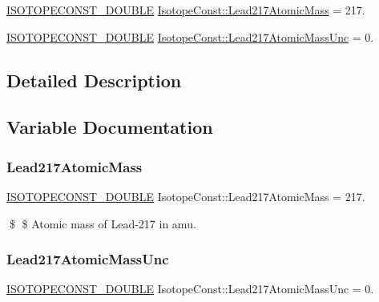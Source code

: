 \begin{DoxyCompactItemize}
\item 
\mbox{\hyperlink{group___isotope_const-_macros_ga8f45a7272ce02c0b4c65c44636ed719a}{I\+S\+O\+T\+O\+P\+E\+C\+O\+N\+S\+T\+\_\+\+D\+O\+U\+B\+LE}} \mbox{\hyperlink{group___isotope_const-_lead-_pb217_gacf2c0284870770903754b5be3a108e2a}{Isotope\+Const\+::\+Lead217\+Atomic\+Mass}} = 217.
\item 
\mbox{\hyperlink{group___isotope_const-_macros_ga8f45a7272ce02c0b4c65c44636ed719a}{I\+S\+O\+T\+O\+P\+E\+C\+O\+N\+S\+T\+\_\+\+D\+O\+U\+B\+LE}} \mbox{\hyperlink{group___isotope_const-_lead-_pb217_ga06a40ecb5d6ccb4c1ce7fa7d09f90de0}{Isotope\+Const\+::\+Lead217\+Atomic\+Mass\+Unc}} = 0.
\end{DoxyCompactItemize}


\subsection{Detailed Description}


\subsection{Variable Documentation}
\mbox{\label{group___isotope_const-_lead-_pb217_gacf2c0284870770903754b5be3a108e2a}} 
\subsubsection{\texorpdfstring{Lead217\+Atomic\+Mass}{Lead217AtomicMass}}
{\footnotesize\ttfamily \mbox{\hyperlink{group___isotope_const-_macros_ga8f45a7272ce02c0b4c65c44636ed719a}{I\+S\+O\+T\+O\+P\+E\+C\+O\+N\+S\+T\+\_\+\+D\+O\+U\+B\+LE}} Isotope\+Const\+::\+Lead217\+Atomic\+Mass = 217.}

\$ \$ Atomic mass of Lead-\/217 in amu. \mbox{\label{group___isotope_const-_lead-_pb217_ga06a40ecb5d6ccb4c1ce7fa7d09f90de0}} 
\subsubsection{\texorpdfstring{Lead217\+Atomic\+Mass\+Unc}{Lead217AtomicMassUnc}}
{\footnotesize\ttfamily \mbox{\hyperlink{group___isotope_const-_macros_ga8f45a7272ce02c0b4c65c44636ed719a}{I\+S\+O\+T\+O\+P\+E\+C\+O\+N\+S\+T\+\_\+\+D\+O\+U\+B\+LE}} Isotope\+Const\+::\+Lead217\+Atomic\+Mass\+Unc = 0.}

